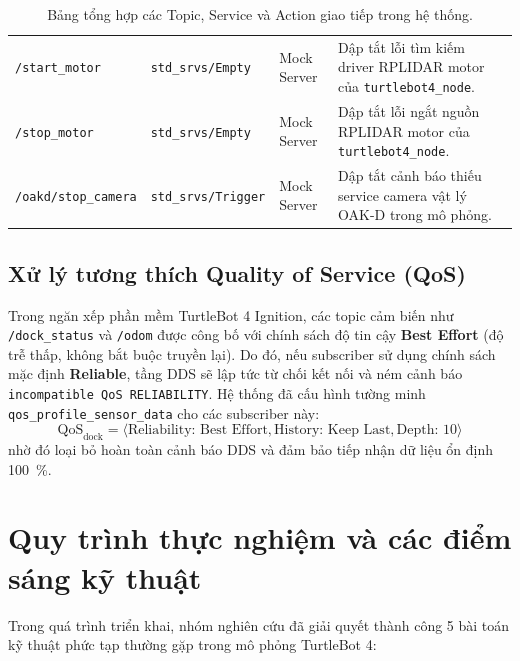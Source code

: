 \begin{table}[H]
\begin{tabularx}{\textwidth}{>{\raggedright\arraybackslash}p{2.6cm} >{\raggedright\arraybackslash}p{2.6cm} >{\raggedright\arraybackslash}p{2.0cm} X}
\addlinespace[2pt]
\texttt{/start\_motor} & \texttt{std\_srvs/}\newline\texttt{Empty} & Mock Server & Dập tắt lỗi tìm kiếm driver RPLIDAR motor của \texttt{turtlebot4\_node}. \\
\addlinespace[2pt]
\texttt{/stop\_motor} & \texttt{std\_srvs/}\newline\texttt{Empty} & Mock Server & Dập tắt lỗi ngắt nguồn RPLIDAR motor của \texttt{turtlebot4\_node}. \\
\addlinespace[2pt]
\texttt{/oakd/stop\_camera} & \texttt{std\_srvs/}\newline\texttt{Trigger} & Mock Server & Dập tắt cảnh báo thiếu service camera vật lý OAK-D trong mô phỏng. \\
\bottomrule
\end{tabularx}
\caption{Bảng tổng hợp các Topic, Service và Action giao tiếp trong hệ thống.}
\label{tab:system_interfaces}
\end{table}

\subsection{Xử lý tương thích Quality of Service (QoS)}
Trong ngăn xếp phần mềm TurtleBot 4 Ignition, các topic cảm biến như \texttt{/dock\_status} và \texttt{/odom} được công bố với chính sách độ tin cậy \textbf{Best Effort} (độ trễ thấp, không bắt buộc truyền lại). Do đó, nếu subscriber sử dụng chính sách mặc định \textbf{Reliable}, tầng DDS sẽ lập tức từ chối kết nối và ném cảnh báo \texttt{incompatible QoS RELIABILITY}. Hệ thống đã cấu hình tường minh \texttt{qos\_profile\_sensor\_data} cho các subscriber này:
\begin{equation}
    \text{QoS}_{\text{dock}} = \langle \text{Reliability: Best Effort}, \text{History: Keep Last}, \text{Depth: } 10 \rangle
\end{equation}
nhờ đó loại bỏ hoàn toàn cảnh báo DDS và đảm bảo tiếp nhận dữ liệu ổn định \SI{100}{\percent}.

\section{Quy trình thực nghiệm và các điểm sáng kỹ thuật}

Trong quá trình triển khai, nhóm nghiên cứu đã giải quyết thành công 5 bài toán kỹ thuật phức tạp thường gặp trong mô phỏng TurtleBot 4:

